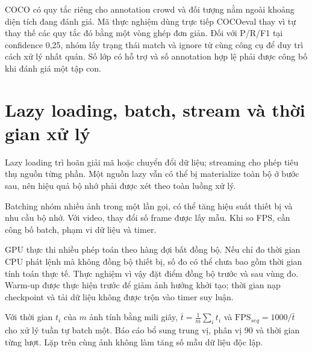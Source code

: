 COCO có quy tắc riêng cho annotation crowd và đối tượng nằm ngoài khoảng diện tích đang đánh giá. Mã thực nghiệm dùng trực tiếp COCOeval thay vì tự thay thế các quy tắc đó bằng một vòng ghép đơn giản. Đối với P/R/F1 tại confidence 0,25, nhóm lấy trạng thái match và ignore từ cùng công cụ để duy trì cách xử lý nhất quán. Số lớp có hỗ trợ và số annotation hợp lệ phải được công bố khi đánh giá một tập con.

\section{Lazy loading, batch, stream và thời gian xử lý}
Lazy loading trì hoãn giải mã hoặc chuyển đổi dữ liệu; streaming cho phép tiêu thụ nguồn từng phần. Một nguồn lazy vẫn có thể bị materialize toàn bộ ở bước sau, nên hiệu quả bộ nhớ phải được xét theo toàn luồng xử lý.

Batching nhóm nhiều ảnh trong một lần gọi, có thể tăng hiệu suất thiết bị và nhu cầu bộ nhớ. Với video,  thay đổi số frame được lấy mẫu. Khi so FPS, cần công bố batch, phạm vi dữ liệu và timer.

GPU thực thi nhiều phép toán theo hàng đợi bất đồng bộ. Nếu chỉ đo thời gian CPU phát lệnh mà không đồng bộ thiết bị, số đo có thể chưa bao gồm thời gian tính toán thực tế. Thực nghiệm vì vậy đặt điểm đồng bộ trước và sau vùng đo. Warm-up được thực hiện trước để giảm ảnh hưởng khởi tạo; thời gian nạp checkpoint và tải dữ liệu không được trộn vào timer suy luận.

Với thời gian $t_i$ của $m$ ảnh tính bằng mili giây, $\bar{t}=\frac{1}{m}\sum_i t_i$ và $\mathrm{FPS}_{seq}=1000/\bar{t}$ cho xử lý tuần tự batch một. Báo cáo bổ sung trung vị, phân vị 90 và thời gian từng lượt. Lặp trên cùng ảnh không làm tăng số mẫu dữ liệu độc lập.


